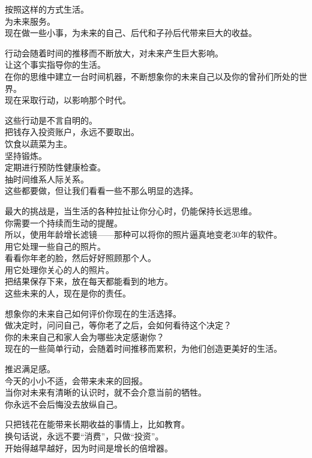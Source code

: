 \documentclass[
]{article}
\begin{document}
按照这样的方式生活。\\
为未来服务。\\
现在做一些小事，为未来的自己、后代和子孙后代带来巨大的收益。

行动会随着时间的推移而不断放大，对未来产生巨大影响。\\
让这个事实指导你的生活。\\
在你的思维中建立一台时间机器，不断想象你的未来自己以及你的曾孙们所处的世界。\\
现在采取行动，以影响那个时代。

这些行动是不言自明的。\\
把钱存入投资账户，永远不要取出。\\
饮食以蔬菜为主。\\
坚持锻炼。\\
定期进行预防性健康检查。\\
抽时间维系人际关系。\\
这些都要做，但让我们看看一些不那么明显的选择。

最大的挑战是，当生活的各种拉扯让你分心时，仍能保持长远思维。\\
你需要一个持续而生动的提醒。\\
所以，使用年龄增长滤镜------那种可以将你的照片逼真地变老30年的软件。\\
用它处理一些自己的照片。\\
看看你年老的脸，然后好好照顾那个人。\\
用它处理你关心的人的照片。\\
把结果保存下来，放在每天都能看到的地方。\\
这些未来的人，现在是你的责任。

想象你的未来自己如何评价你现在的生活选择。\\
做决定时，问问自己，等你老了之后，会如何看待这个决定？\\
你的未来自己和家人会为哪些决定感谢你？\\
现在的一些简单行动，会随着时间推移而累积，为他们创造更美好的生活。

推迟满足感。\\
今天的小小不适，会带来未来的回报。\\
当你对未来有清晰的认识时，就不会介意当前的牺牲。\\
你永远不会后悔没去放纵自己。

只把钱花在能带来长期收益的事情上，比如教育。\\
换句话说，永远不要``消费''，只做``投资''。\\
开始得越早越好，因为时间是增长的倍增器。
\end{document}
